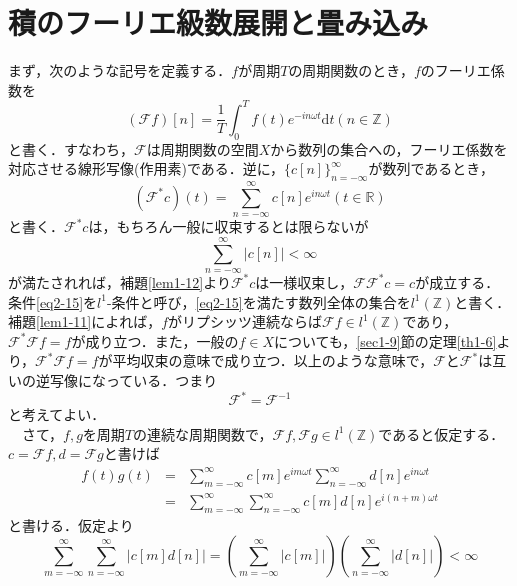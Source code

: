 \documentclass[a4j]{jsbook}
\numberwithin{theorem}{chapter}  %
\begin{document}
\section{積のフーリエ級数展開と畳み込み} \label{sec2-4}
まず，次のような記号を定義する．\(f\)が周期\(T\)の周期関数のとき，\(f\)のフーリエ係数を
\begin{equation*}
    (\mathcal{F}f)[n]=\frac{1}{T}\int_0^T f(t)e^{-in\omega t}\mathrm{d}t (n\in\mathbb{Z})
\end{equation*}
と書く．すなわち，\(\mathcal{F}\)は周期関数の空間\(X\)から数列の集合への，フーリエ係数を対応させる線形写像(作用素)である．逆に，\(\{c[n]\}_{n=-\infty}^\infty\)が数列であるとき，
\begin{equation*}
    (\mathcal{F}^* c)(t)=\sum_{n=-\infty}^\infty c[n]e^{in\omega t} (t\in\mathbb{R})
\end{equation*}
と書く．\(\mathcal{F}^* c\)は，もちろん一般に収束するとは限らないが
\begin{equation}
    \sum_{n=-\infty}^\infty |c[n]|<\infty \label{eq2-15}
\end{equation}
が満たされれば，補題\ref{lem1-12}より\(\mathcal{F}^* c\)は一様収束し，\(\mathcal{F}\mathcal{F}^* c=c\)が成立する．条件\eqref{eq2-15}を\(l^1\)-条件と呼び，\eqref{eq2-15}を満たす数列全体の集合を\(l^1(\mathbb{Z})\)と書く．補題\ref{lem1-11}によれば，\(f\)がリプシッツ連続ならば\(\mathcal{F}f\in l^1(\mathbb{Z})\)であり，\(\mathcal{F}^*\mathcal{F}f=f\)が成り立つ．また，一般の\(f\in X\)についても，\ref{sec1-9}節の定理\ref{th1-6}より，\(\mathcal{F}^*\mathcal{F}f=f\)が平均収束の意味で成り立つ．以上のような意味で，\(\mathcal{F}\)と\(\mathcal{F}^*\)は互いの逆写像になっている．つまり
\begin{equation*}
    \mathcal{F}^*=\mathcal{F}^{-1}
\end{equation*}
と考えてよい．\\
　さて，\(f, g\)を周期\(T\)の連続な周期関数で，\(\mathcal{F}f, \mathcal{F}g\in l^1(\mathbb{Z})\)であると仮定する．\(c=\mathcal{F}f, d=\mathcal{F}g\)と書けば
\begin{eqnarray*}
f(t)g(t)&=&\sum_{m=-\infty}^\infty c[m]e^{im\omega t}\sum_{n=-\infty}^\infty d[n]e^{in\omega t} \\
&=&\sum_{m=-\infty}^\infty\sum_{n=-\infty}^\infty c[m]d[n]e^{i(n+m)\omega t}
\end{eqnarray*}
と書ける．仮定より
\begin{equation*}
    \sum_{m=-\infty}^\infty\sum_{n=-\infty}^\infty|c[m]d[n]|=\left(\sum_{m=-\infty}^\infty |c[m]|\right)\left(\sum_{n=-\infty}^\infty |d[n]|\right)<\infty
\end{equation*}
\end{document}
